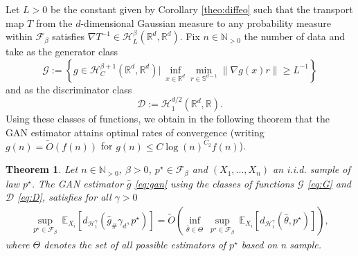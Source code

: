 \documentclass{article}
\newtheorem{theorem}{Theorem}
\begin{document}
Let $L>0$ be the constant given by Corollary \ref{theo:diffeo} such that the transport map $T$ from the $d$-dimensional Gaussian measure to any probability measure within $\mathcal{F}_\beta$ satisfies  $\nabla T^{-1}\in  \mathcal{H}^{\beta}_L   (\mathbb{R}^d,\mathbb{R}^d)$. Fix $n\in \mathbb{N}_{>0}$ the number of data and take as the generator class
\begin{equation}\label{eq:G}
\mathcal{G}:= \left\{g \in \mathcal{H}^{\beta+1}_{C}(\mathbb{R}^d,\mathbb{R}^d)\Big|\ \inf_{x\in \mathbb{R}^{d}}\min_{r\in \mathbb{S}^{d-1}} \|\nabla g(x)r \|\geq L^{-1}\right\}
\end{equation}
 and as the discriminator class
\begin{equation}\label{eq:D}
\mathcal{D}:=\mathcal{H}^{d/2}_{1}(\mathbb{R}^d,\mathbb{R}).
\end{equation}
Using these classes of functions, we obtain in the following theorem that the GAN estimator attains optimal rates of convergence (writing $g(n)=\tilde{O}( f(n))$ for $g(n)\leq C \log(n)^{C_2} f(n)$).

\begin{theorem}\label{theo:minimaxgan}
 Let $n\in \mathbb{N}_{>0}$, $\beta> 0$, $p^\star \in \mathcal{F}_\beta$ and $(X_1,...,X_n)$ an i.i.d. sample of law $p^\star$. The GAN estimator $\hat{g}$ \eqref{eq:gan} using the classes of functions $\mathcal{G}$ \eqref{eq:G} and $\mathcal{D}$ \eqref{eq:D}, satisfies for all $\gamma>0$
\begin{align*}
    \sup_{p^\star \in \mathcal{F}_\beta}\ \mathbb{E}_{X_i}[d_{\mathcal{H}^{\gamma}_1}(\hat{g}_{\# }\gamma_d,p^\star)] =\tilde{O}\left( \inf_{\hat{\theta}\in \Theta}\ \sup_{p^\star\in \mathcal{F}_\beta}\ \mathbb{E}_{X_i}[d_{\mathcal{H}^{\gamma}_1}(\hat{\theta},p^\star)]\right),
\end{align*}
where $\Theta$ denotes the set of all possible estimators  of $p^\star$ based on n sample.
\end{theorem}
\end{document}
